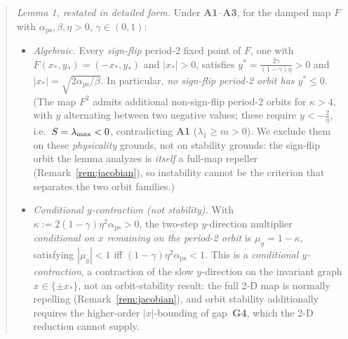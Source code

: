 \begin{quote}
\emph{Lemma 1, restated in detailed form.} Under \textbf{A1}--\textbf{A3}, for the damped map $F$ with
$\alpha_{\mathrm{ps}},\beta,\eta>0$, $\gamma\in(0,1)$:
\begin{itemize}
  \item[\textbf{(a)}] \emph{Algebraic.} Every \emph{sign-flip} period-2 fixed
        point of $F$, one with $F(x_{*},y_{*})=(-x_{*},y_{*})$ and
        $|x_{*}|>0$, satisfies $y^{*}=\tfrac{2\gamma}{(1-\gamma)\eta}>0$ and
        $|x_{*}|=\sqrt{2\alpha_{\mathrm{ps}}/\beta}$. In particular, \emph{no sign-flip
        period-2 orbit has $y^{*}\leq0$}. (The map $F^{2}$ admits additional
        non-sign-flip period-2 orbits for $\kappa>4$, with $y$ alternating
        between two negative values; these require $y<-\tfrac{2}{\eta}$, i.e.\
        $S=\lambda_{\max}<0$, contradicting \textbf{A1} ($\lambda_{1}\geq m>0$). We exclude them on
        these \emph{physicality} grounds, not on stability grounds: the
        sign-flip orbit the lemma analyzes is \emph{itself} a full-map
        repeller (Remark~\ref{rem:jacobian}), so instability cannot be the
        criterion that separates the two orbit families.)
  \item[\textbf{(b)}] \emph{Conditional $y$-contraction (not stability).} With $\kappa:=2(1-\gamma)\eta^{2}\alpha_{\mathrm{ps}}>0$,
        the two-step $y$-direction multiplier \emph{conditional on $x$ remaining
        on the period-2 orbit} is $\mu_{y}=1-\kappa$, satisfying $|\mu_{y}|<1$
        iff $(1-\gamma)\eta^{2}\alpha_{\mathrm{ps}}<1$. This is a \emph{conditional
        $y$-contraction}, a contraction of the slow $y$-direction on the
        invariant graph $x\in\{\pm x_{*}\}$, not an orbit-stability result: the
        full 2-D map is normally repelling (Remark~\ref{rem:jacobian}), and orbit
        stability additionally requires the higher-order $|x|$-bounding of
        gap~\textbf{G4}, which the 2-D reduction cannot supply.
\end{itemize}
\end{quote}

